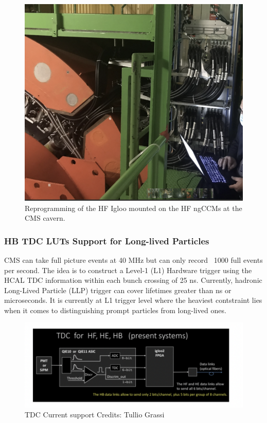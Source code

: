\begin{figure}[!htb]
	\centering
	\includegraphics[scale=0.7]{fig/HFIglooReprogramming.png}
	\caption{Reprogramming of the HF Igloo mounted on the HF ngCCMs at the CMS cavern.}
	\label{fig:HFIglooReprogramming}
\end{figure}

\subsubsection{HB TDC LUTs Support for Long-lived Particles}

CMS can take full picture events at 40 MHz but can only record ~1000 full events per second. The idea is to construct a Level-1 (L1) Hardware trigger using the HCAL TDC information within each bunch crossing of 25 ns. Currently, hadronic Long-Lived Particle (LLP) trigger can cover lifetimes greater than ns or microseconds. It is currently at L1 trigger level where the heaviest contstraint lies when it comes to distinguishing prompt particles from long-lived ones. 

\begin{figure}[tbp!]
\begin{center}
\includegraphics[scale=0.9]{fig/TDCLLP.png}
\end{center}
\caption{TDC Current support Credits: Tullio Grassi}
\label{fig:TDCHBLimits}
\end{figure}

